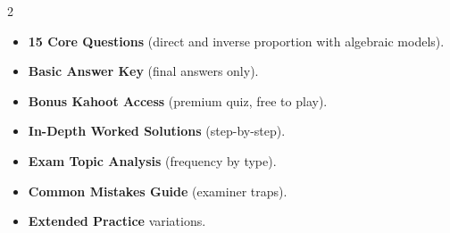 \documentclass[11pt,a4paper]{article}
\newcommand{\FullReleaseDate}{April 30, 2026}
\begin{document}
\vspace{8pt}

\begin{multicols}{2}
  \begin{tcolorbox}[card, title=\sffamily\bfseries\textcolor{white}{\faHandPointDown\ TODAY (Simplified Version)}, colbacktitle=mainblue, boxed title style={sharp corners, boxrule=0pt}]
    \begin{itemize}[leftmargin=1.2em, itemsep=2pt]
      \item \small \textbf{15 Core Questions} (direct and inverse proportion with algebraic models).
      \item \small \textbf{Basic Answer Key} (final answers only).
      \item \small \textbf{Bonus Kahoot Access} (premium quiz, free to play).
    \end{itemize}
  \end{tcolorbox}

  \columnbreak

  \begin{tcolorbox}[card, title=\sffamily\bfseries\textcolor{white}{\faRocket\ ON \FullReleaseDate\ (Full Upgrade)}, colbacktitle=mainblue, boxed title style={sharp corners, boxrule=0pt}]
    \begin{itemize}[leftmargin=1.2em, itemsep=2pt]
      \item \small \textbf{In-Depth Worked Solutions} (step-by-step).
      \item \small \textbf{Exam Topic Analysis} (frequency by type).
      \item \small \textbf{Common Mistakes Guide} (examiner traps).
      \item \small \textbf{Extended Practice} variations.
    \end{itemize}
  \end{tcolorbox}
\end{multicols}
\end{document}
